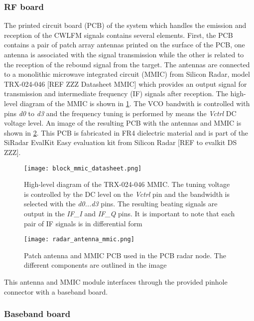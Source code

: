 \subsubsection{RF board}

The printed circuit board (PCB) of the system which handles the emission and reception of the CWLFM signals contains several elements. First, the PCB contains a pair of patch array antennas printed on the surface of the PCB, one antenna is associated with the signal transmission while the other is related to the reception of the rebound signal from the target. The antennas are connected to a monolithic microwave integrated circuit (MMIC) from Silicon Radar, model TRX-024-046 [REF ZZZ Datasheet MMIC] which provides an output signal for transmission and intermediate frequency (IF) signals after reception. The high-level diagram of the MMIC is shown in \cref{fig:block_mmic}. The VCO bandwith is controlled with pins \textit{d0} to \textit{d3} and the frequency tuning is performed by means the \textit{Vctrl} DC voltage level. An image of the resulting PCB with the antennas and MMIC is shown in \cref{fig:rf_board}. This PCB is fabricated in FR4 dielectric material and is part of the SiRadar EvalKit Easy evaluation kit from Silicon Radar [REF to evalkit DS ZZZ].

\begin{figure}[ht]
	\centering
	\texttt{[image: block\_mmic\_datasheet.png]}
	\caption{High-level diagram of the TRX-024-046 MMIC. The tuning voltage is controlled by the DC level on the \textit{Vctrl} pin and the bandwidth is selected with the \textit{d0...d3} pins. The resulting beating signals are output in the \textit{IF\_I} and \textit{IF\_Q} pins. It is important to note that each pair of IF signals is in differential form \label{fig:block_mmic}}
\end{figure}

\begin{figure}[ht]
	\centering
	\texttt{[image: radar\_antenna\_mmic.png]}
	\caption{Patch antenna and MMIC PCB used in the PCB radar node. The different components are outlined in the image \label{fig:rf_board}}
\end{figure}

This antenna and MMIC module interfaces through the provided pinhole connector with a baseband board.

\subsubsection{Baseband board}

